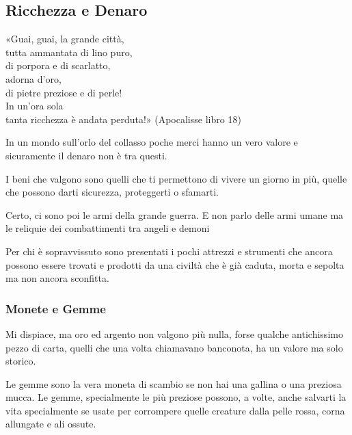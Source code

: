 \documentclass[12pt,a4paper,twoside,openany]{book}
\begin{document}
\begin{multicols}{2}

\subsection{Ricchezza e Denaro}


\begin{changemargin}{0.3cm}{0.3cm}\begin{enfasi}{
«Guai, guai, la grande città,\\
tutta ammantata di lino puro,\\
di porpora e di scarlatto,\\
adorna d’oro,\\
di pietre preziose e di perle!\\
In un’ora sola\\
tanta ricchezza è andata perduta!» (Apocalisse libro 18)
}\end{enfasi}\end{changemargin}

\label{ricchezza-e-denaro}

In un mondo sull'orlo del collasso poche merci hanno un vero valore e sicuramente il denaro non è tra questi.

I beni che valgono sono quelli che ti permettono di vivere un giorno in più, quelle che possono darti sicurezza, proteggerti o sfamarti.

Certo, ci sono poi le armi della grande guerra. E non parlo delle armi umane ma le reliquie dei combattimenti tra angeli e demoni

Per chi è sopravvissuto sono presentati i pochi attrezzi e strumenti che ancora possono essere trovati e prodotti da una civiltà che è già caduta, morta e sepolta ma non ancora sconfitta.

\subsubsection{Monete e Gemme}

Mi dispiace, ma oro ed argento non valgono più nulla, forse qualche antichissimo pezzo di carta, quelli che una volta chiamavano banconota, ha un valore ma solo storico.

Le gemme sono la vera moneta di scambio se non hai una gallina o una preziosa mucca. Le gemme, specialmente le più preziose possono, a volte, anche salvarti la vita specialmente se usate per corrompere quelle creature dalla pelle rossa, corna allungate e ali ossute.


\end{multicols}
\end{document}
